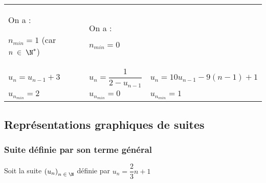\begin{tabular}{lll}
On a :

$n_{min} = 1$ (car $n \; \in \; \N^*$)

& 

\hspace*{-.3cm}

On a :

$n_{min} = 0$ \\

\hspace*{-1cm}

$u_n = u_{n-1} +3$ & 

\hspace*{.4cm}

$u_n = \dfrac{1}{2 - u_{n-1}}$ & 

\hspace*{.7cm}

$u_n = 10u_{n-1} - 9\left(n-1\right) + 1$  \\

\hspace*{-1cm}

$u_{n_{min}} = 2$ & 

\hspace*{.4cm}

$u_{n_{min}} = 0$ & 

\hspace*{.7cm}

$u_{n_{min}} = 1$ \\

\end{tabular}

\newpage

\subsection{Représentations graphiques de suites}

\subsubsection{Suite définie par son terme général}

Soit la suite $\left(u_n\right)_{n \; \in \; \N}$ définie par $u_n = \dfrac{2}{3}n + 1$ \\






